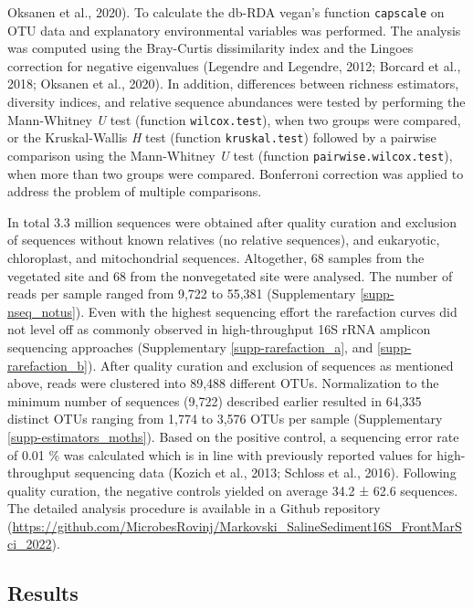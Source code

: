 \documentclass[12pt,]{article}
\begin{document}
Oksanen et al., 2020). To calculate the db-RDA vegan's function
\texttt{capscale} on OTU data and explanatory environmental variables
was performed. The analysis was computed using the Bray-Curtis
dissimilarity index and the Lingoes correction for negative eigenvalues
(Legendre and Legendre, 2012; Borcard et al., 2018; Oksanen et al.,
2020). In addition, differences between richness estimators, diversity
indices, and relative sequence abundances were tested by performing the
Mann-Whitney \emph{U} test (function \texttt{wilcox.test}), when two
groups were compared, or the Kruskal-Wallis \emph{H} test (function
\texttt{kruskal.test}) followed by a pairwise comparison using the
Mann-Whitney \emph{U} test (function \texttt{pairwise.wilcox.test}),
when more than two groups were compared. Bonferroni correction was
applied to address the problem of multiple comparisons.

In total 3.3 million sequences were obtained after quality curation and
exclusion of sequences without known relatives (no relative sequences),
and eukaryotic, chloroplast, and mitochondrial sequences. Altogether, 68
samples from the vegetated site and 68 from the nonvegetated site were
analysed. The number of reads per sample ranged from 9,722 to 55,381
(Supplementary \autoref{supp-nseq_notus}). Even with the highest
sequencing effort the rarefaction curves did not level off as commonly
observed in high-throughput 16S rRNA amplicon sequencing approaches
(Supplementary \autoref{supp-rarefaction_a}, and
\ref{supp-rarefaction_b}). After quality curation and exclusion of
sequences as mentioned above, reads were clustered into 89,488 different
OTUs. Normalization to the minimum number of sequences (9,722) described
earlier resulted in 64,335 distinct OTUs ranging from 1,774 to 3,576
OTUs per sample (Supplementary \autoref{supp-estimators_moths}). Based
on the positive control, a sequencing error rate of 0.01 \si{\percent}
was calculated which is in line with previously reported values for
high-throughput sequencing data (Kozich et al., 2013; Schloss et al.,
2016). Following quality curation, the negative controls yielded on
average 34.2 ± 62.6 sequences. The detailed analysis procedure is
available in a Github repository
(\url{https://github.com/MicrobesRovinj/Markovski_SalineSediment16S_FrontMarSci_2022}).

\newpage

\hypertarget{results}{%
\subsection{Results}\label{results}}
\end{document}
